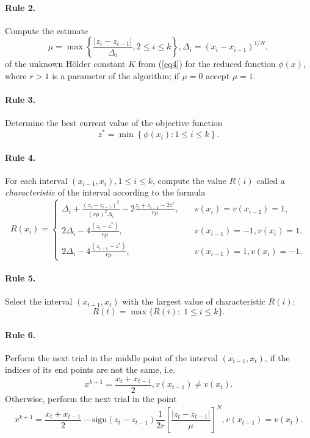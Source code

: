 \documentclass[runningheads]{llncs}
\begin{document}
\paragraph{Rule 2.} Compute the estimate
\begin{equation}\label{eq7} 
\mu = \max\left\{ \frac{|z_i-z_{i-1}|}{\Delta _i}, 2 \leq i \leq k \right\} , \Delta _i= (x_i-x_{i-1})^{1/N},
\end{equation}
of the unknown H{\"o}lder constant $K$ from (\ref{eq4}) for the reduced function $\phi(x)$, where $r>1$ is a parameter of the algorithm; if $\mu=0$ accept $\mu=1$.
\paragraph{Rule 3.} Determine the best current value of the objective function
\begin{equation}\label{eq8} 
z^*=\min \left\{ \phi (x_i): 1\leq i \leq k \right\}.
\end{equation}

\paragraph{Rule 4.} For each interval $(x_{i-1},x_i),1 \leq i \leq k$, compute the value $R(i)$ called a \textit{characteristic} of the interval according to the formula
\begin{equation}\label{eq9} 
R(x_i)=
  \begin{cases}
    \Delta _i+\frac {{(z_i-z_{i-1})}^2}{{(r \mu)}^2 \Delta _i} - 2 \frac {z_i+z_{i-1}-2z^*}{r \mu}, & {\quad  v(x_i)=v(x_{i-1})=1},\\
    2 \Delta _i-4 \frac {(z_i-z^*)}{r \mu}, & {\quad  v(x_{i-1})=-1, v(x_i)=1},\\
    2 \Delta _i-4 \frac {(z_{i-1}-z^*)}{r \mu}, & {\quad  v(x_{i-1})=1, v(x_i)=-1.}
  \end{cases}
\end{equation}

\paragraph{Rule 5.} Select the interval $(x_{t-1},x_t)$ with the largest value of characteristic $R(i)$:
\[
R(t)= \max\{R(i): \; 1 \leq i \leq k\}.
\]

\paragraph{Rule 6.} Perform the next trial in the middle point of the interval $(x_{t-1},x_t)$, if the indices of its end points are not the same, i.e.
\begin{equation}\label{eq10} 
x^{k+1}=\frac {x_t+x_{t-1}}{2}, v(x_{t-1})\neq v(x_t).
\end{equation}
Otherwise, perform the next trial in the point
\begin{equation}\label{eq11} 
x^{k+1}= \frac {x_t+x_{t-1}}{2} -  \text{sign} {(z_t-z_{t-1})} \frac{1}{2r} \left[\frac {{|z_t-z_{t-1}|}}{\mu} \right]^N, v(x_{t-1})=v(x_t).
\end{equation}
\end{document}
